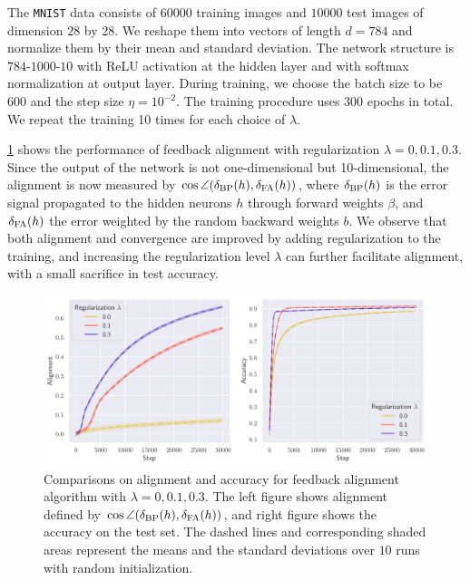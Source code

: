 The \texttt{MNIST} data consists of $60000$ training images and $10000$ test images of dimension $28$ by $28$. We reshape them into vectors of length $d = 784$ and normalize them by their mean and standard deviation. The network structure is $784$-$1000$-$10$ with ReLU activation at the hidden layer and with softmax normalization at output layer. During training, we choose the batch size to be $600$ and the step size $\eta = 10^{-2}$. The training procedure uses $300$ epochs in total. We repeat the training 10 times for each choice of $\lambda$.

\cref{fig:mnist} shows the performance of feedback alignment with regularization $\lambda = 0, 0.1, 0.3$. Since the output of the network is not one-dimensional but 10-dimensional, the alignment is now measured by $\cos \angle(\delta_\mathrm{BP}(h),\delta_\mathrm{FA}(h))$, where $\delta_\mathrm{BP}(h)$ is the error signal propagated to the hidden neurons $h$ through forward weights $\beta$, and $\delta_\mathrm{FA}(h)$ the error weighted by the random backward weights $b$. We observe that both alignment and convergence are improved by adding regularization to the training, and increasing the regularization level $\lambda$ can further facilitate alignment, with a small sacrifice in test accuracy.

\begin{figure}[t]
  \centering
  \includegraphics[width=\textwidth]{figures/mnist_2l_v6_horizontal.pdf}
  \caption{Comparisons on alignment and accuracy for feedback alignment algorithm with $\lambda=0,0.1,0.3$. The left figure shows alignment defined by $\cos \angle(\delta_\mathrm{BP}(h),\delta_\mathrm{FA}(h))$, and right figure shows the accuracy on the test set. The dashed lines and corresponding shaded areas represent the means and the standard deviations over $10$ runs with random initialization.}
  \label{fig:mnist}
\end{figure}
